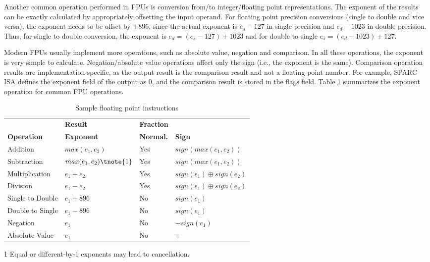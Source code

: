 \documentclass[12pt]{yalephd}
\newcommand{\subsubsubsection}[1] {\noindent {\underline {#1}}}
\begin{document}
\subsubsubsection{Conversions}

Another common operation performed in FPUs is conversion from/to integer/floating point representations. The exponent of the results can be exactly calculated by appropriately offsetting the input operand. For floating point precision conversions (single to double and vice versa), the exponent needs to be offset by $\pm 896$, since the actual exponent is $e_s-127$ in single precision and $e_d-1023$ in double precision. Thus, for single to double conversion, the exponent is $e_d = (e_s - 127) + 1023$ and for double to single $e_s = (e_d - 1023) + 127$.

\subsubsubsection{Other operations}\label{sC3sOtherOps}

Modern FPUs usually implement more operations, such as absolute value, negation and comparison. In all these operations, the exponent is very simple to calculate. Negation/absolute value operations affect only the sign (i.e., the exponent is the same). Comparison operation results are implementation-specific, as the output result is the comparison result and not a floating-point number. For example, SPARC ISA defines the exponent field of the output as 0, and the comparison result is stored in the flags field. Table \ref{sC3tSampleFloatInsts} summarizes the exponent operation for common FPU operations.

\begin{table}[!ht]
\caption{Sample floating point instructions}\label{sC3tSampleFloatInsts}
\begin{center}
\begin{threeparttable}[b]
\begin{tabular}{||l|l|l|l||}
\hline
\hline
 & {\bf Result} &{\bf Fraction} & \\
{\bf Operation} & {\bf Exponent} & {\bf Normal.} & {\bf Sign} \\
\hline
\hline
Addition & $max(e_1, e_2)$ & Yes & $sign(max(e_1, e_2))$ \\
\hline
Subtraction & $max(e_1, e_2)\tnote{1}$ & Yes & $sign(max(e_1, e_2))$ \\
\hline
Multiplication & $e_1+e_2$ & Yes & $sign(e_1) \oplus sign(e_2)$ \\
\hline
Division & $e_1-e_2$ & Yes & $sign(e_1) \oplus sign(e_2)$ \\
\hline
Single to Double & $e_1+896$ & No & $sign(e_1)$\\
\hline
Double to Single & $e_1-896$ & No & $sign(e_1)$\\
\hline
Negation & $e_1$ & No & $-sign(e_1)$ \\
\hline
Absolute Value & $e_1$ & No & $+$\\

\hline
\hline
\end{tabular}
  \begin{tablenotes}
    \item[1] Equal or different-by-1 exponents may lead to cancellation.
  \end{tablenotes}
\end{threeparttable}
\end{center}
\end{table}
\end{document}
